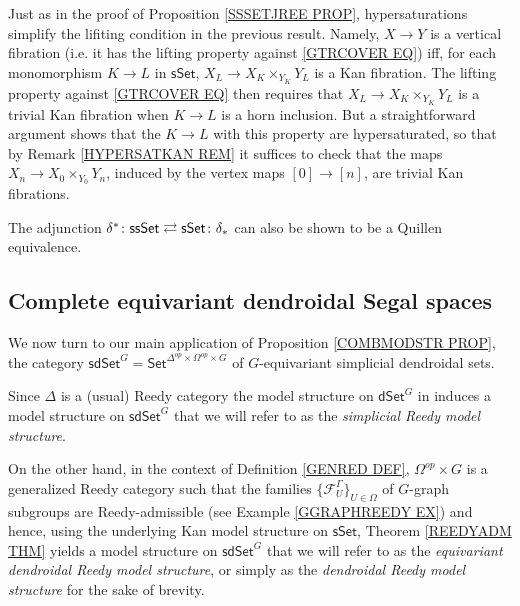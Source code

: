 \documentclass[a4paper,10pt
,draft
]{article}%
\begin{document}
\begin{remark}\label{HYPERSIMPL REM}
	Just as in the proof of Proposition \ref{SSSETJREE PROP}, hypersaturations simplify the lifiting condition
	in the previous result. 
	Namely,	$X \to Y$ is a vertical fibration (i.e. it has the lifting property against \eqref{GTRCOVER EQ})
	iff, for each monomorphism $K \to L$ in $\mathsf{sSet}$,
	$X_L \to X_K \times_{Y_K} Y_L$
	is a Kan fibration.
	The lifting property against \eqref{GTRCOVER EQ}
	then requires that 
	$X_L \to X_K \times_{Y_K} Y_L$ is a trivial Kan fibration
	when $K \to L$ is a horn inclusion. 
	But a straightforward argument shows that the $K \to L$ with this property are hypersaturated,
	so that by 
Remark \ref{HYPERSATKAN REM} it suffices to check that the maps $X_n \to X_0 \times_{Y_0} Y_n$, induced by the vertex maps $[0] \to [n]$, are trivial Kan fibrations.
\end{remark}


\begin{remark}
The adjunction 
$
	\delta^{\**}\colon \mathsf{ssSet}
		\rightleftarrows 
	\mathsf{sSet} \colon \delta_{\**}
$
can also be shown to be a Quillen equivalence.
\end{remark}


\subsection{Complete equivariant dendroidal Segal spaces}
\label{CEDSS SEC}


We now turn to our main application of Proposition \ref{COMBMODSTR PROP}, the category 
$\mathsf{sdSet}^G = \mathsf{Set}^{\Delta^{op} \times \Omega^{op} \times G}$
of $G$-equivariant simplicial dendroidal sets.

Since $\Delta$ is a (usual) Reedy category the model structure on $\mathsf{dSet}^G$ 
in \cite[Thm. 2.1]{Per17} induces 
a model structure on $\mathsf{sdSet}^G$
that we will refer to as the \textit{simplicial Reedy model structure}.

On the other hand, in the context of Definition \ref{GENRED DEF},
$\Omega^{op} \times G$ is a generalized Reedy category such that the families $\{\mathcal{F}_{U}^{\Gamma}\}_{U \in \Omega}$
of $G$-graph subgroups are Reedy-admissible 
(see Example \ref{GGRAPHREEDY EX})
and hence, using the underlying 
Kan model structure on $\mathsf{sSet}$, 
Theorem \ref{REEDYADM THM} yields
a model structure on $\mathsf{sdSet}^G$
that we will refer to as the \textit{equivariant dendroidal Reedy model structure}, 
or simply as the \textit{dendroidal Reedy model structure} for the sake of brevity.
\end{document}

